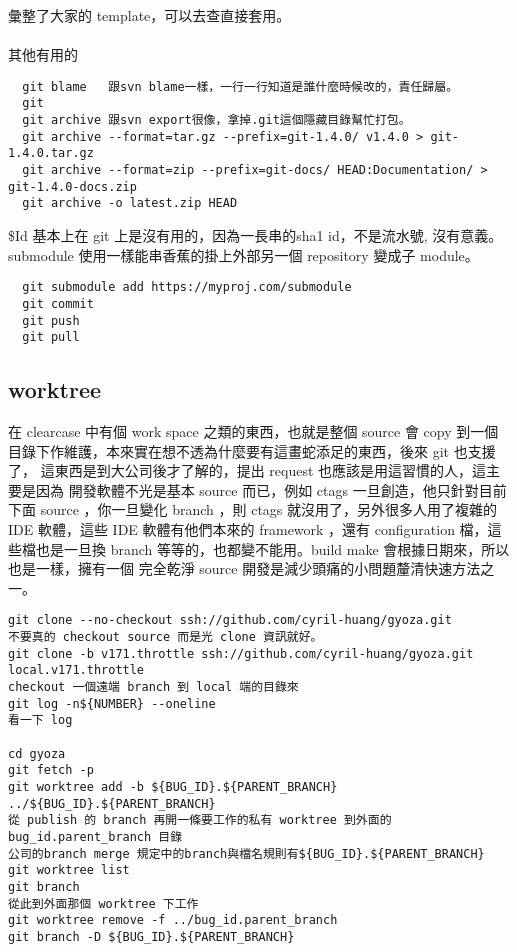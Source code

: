   彙整了大家的 template，可以去查直接套用。
  \\\\
  其他有用的
  \begin{verbatim}
  git blame   跟svn blame一樣，一行一行知道是誰什麼時候改的，責任歸屬。
  git 
  git archive 跟svn export很像，拿掉.git這個隱藏目錄幫忙打包。
  git archive --format=tar.gz --prefix=git-1.4.0/ v1.4.0 > git-1.4.0.tar.gz
  git archive --format=zip --prefix=git-docs/ HEAD:Documentation/ > git-1.4.0-docs.zip
  git archive -o latest.zip HEAD
  \end{verbatim}
  \$Id 基本上在 git 上是沒有用的，因為一長串的sha1 id，不是流水號, 沒有意義。
  submodule 使用一樣能串香蕉的掛上外部另一個 repository 變成子 module。
  \begin{verbatim}
  git submodule add https://myproj.com/submodule
  git commit 
  git push
  git pull
  \end{verbatim}

  \subsection{worktree}
  在 clearcase 中有個 work space 之類的東西，也就是整個 source 會 copy 到一個
  目錄下作維護，本來實在想不透為什麼要有這畫蛇添足的東西，後來 git 也支援了，
  這東西是到大公司後才了解的，提出 request 也應該是用這習慣的人，這主要是因為
  開發軟體不光是基本 source 而已，例如 ctags 一旦創造，他只針對目前下面 source
  ，你一旦變化 branch ，則 ctags 就沒用了，另外很多人用了複雜的 IDE 軟體，這些
  IDE 軟體有他們本來的 framework ，還有 configuration 檔，這些檔也是一旦換
  branch 等等的，也都變不能用。build make 會根據日期來，所以也是一樣，擁有一個
  完全乾淨 source 開發是減少頭痛的小問題釐清快速方法之一。
  \begin{verbatim}
git clone --no-checkout ssh://github.com/cyril-huang/gyoza.git
不要真的 checkout source 而是光 clone 資訊就好。
git clone -b v171.throttle ssh://github.com/cyril-huang/gyoza.git local.v171.throttle
checkout 一個遠端 branch 到 local 端的目錄來
git log -n${NUMBER} --oneline
看一下 log

cd gyoza
git fetch -p
git worktree add -b ${BUG_ID}.${PARENT_BRANCH} ../${BUG_ID}.${PARENT_BRANCH}
從 publish 的 branch 再開一條要工作的私有 worktree 到外面的bug_id.parent_branch 目錄
公司的branch merge 規定中的branch與檔名規則有${BUG_ID}.${PARENT_BRANCH}
git worktree list
git branch
從此到外面那個 worktree 下工作
git worktree remove -f ../bug_id.parent_branch
git branch -D ${BUG_ID}.${PARENT_BRANCH}
  \end{verbatim}


